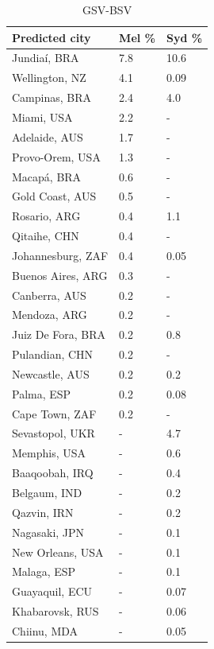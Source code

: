 \documentclass[Crown,sageh,times]{sagej}
\begin{document}
\begin{landscape}
\begin{table}[!htbp]
\begin{subtable}{.34\linewidth}
{\begin{tabular}{ l   l  l}
 \hline  
\textbf{Predicted city}  & \textbf{Mel \%}  &  \textbf{Syd \%}\\ \hline
Jundia\'{i}, BRA&7.8&	10.6\\
Wellington, NZ&	4.1&		0.09\\
Campinas, BRA&		2.4&		4.0\\
Miami, USA&		2.2&- \\
Adelaide, AUS&		1.7&- \\
Provo-Orem, USA&		1.3&- \\
Macap\'{a}, BRA&		0.6&- \\
Gold Coast, AUS&		0.5&- \\
Rosario, ARG&		0.4&		1.1\\
Qitaihe, CHN&		0.4&- \\
Johannesburg, ZAF&		0.4&		0.05\\
Buenos Aires, ARG&		0.3&- \\
Canberra, AUS&		0.2&- \\
Mendoza, ARG&		0.2&- \\
Juiz De Fora, BRA&		0.2&		0.8\\
Pulandian, CHN&		0.2&- \\
Newcastle, AUS&		0.2&		0.2\\
Palma, ESP&		0.2&		0.08\\
Cape Town, ZAF&		0.2&- \\
Sevastopol, UKR&-&		4.7\\
Memphis, USA&-&		0.6\\
Baaqoobah, IRQ&-&		0.4\\
Belgaum, IND&-&		0.2\\
Qazvin, IRN&-&		0.2\\
Nagasaki, JPN&-	&	0.1\\
New Orleans, USA&-&		0.1\\
Malaga, ESP&-&		0.1\\
Guayaquil, ECU&-&		0.07\\
Khabarovsk, RUS&-&		0.06\\
Chiinu, MDA&-&		0.05\\
\end{tabular}
}
\end{subtable}%
\begin{subtable}{.34\linewidth}
\caption{GSV-BSV}
\end{subtable}
\end{table}
\end{landscape}
\end{document}
